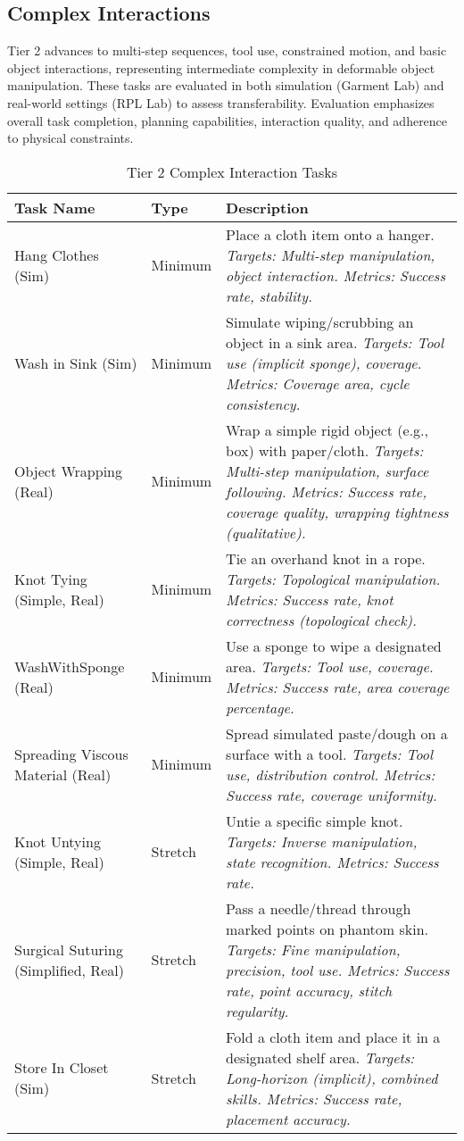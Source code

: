 \subsection{Complex Interactions}

Tier 2 advances to multi-step sequences, tool use, constrained motion, and basic object interactions, representing intermediate complexity in deformable object manipulation. These tasks are evaluated in both simulation (Garment Lab) and real-world settings (RPL Lab) to assess transferability. Evaluation emphasizes overall task completion, planning capabilities, interaction quality, and adherence to physical constraints.

\begin{table}[h]
\centering
\begin{tabular}{|p{3.5cm}|p{2cm}|p{8.5cm}|}
\hline
\textbf{Task Name} & \textbf{Type} & \textbf{Description} \\
\hline
Hang Clothes (Sim) & Minimum & Place a cloth item onto a hanger. \textit{Targets: Multi-step manipulation, object interaction. Metrics: Success rate, stability.} \\
\hline
Wash in Sink (Sim) & Minimum & Simulate wiping/scrubbing an object in a sink area. \textit{Targets: Tool use (implicit sponge), coverage. Metrics: Coverage area, cycle consistency.} \\
\hline
Object Wrapping (Real) & Minimum & Wrap a simple rigid object (e.g., box) with paper/cloth. \textit{Targets: Multi-step manipulation, surface following. Metrics: Success rate, coverage quality, wrapping tightness (qualitative).} \\
\hline
Knot Tying (Simple, Real) & Minimum & Tie an overhand knot in a rope. \textit{Targets: Topological manipulation. Metrics: Success rate, knot correctness (topological check).} \\
\hline
WashWithSponge (Real) & Minimum & Use a sponge to wipe a designated area. \textit{Targets: Tool use, coverage. Metrics: Success rate, area coverage percentage.} \\
\hline
Spreading Viscous Material (Real) & Minimum & Spread simulated paste/dough on a surface with a tool. \textit{Targets: Tool use, distribution control. Metrics: Success rate, coverage uniformity.} \\
\hline
Knot Untying (Simple, Real) & Stretch & Untie a specific simple knot. \textit{Targets: Inverse manipulation, state recognition. Metrics: Success rate.} \\
\hline
Surgical Suturing (Simplified, Real) & Stretch & Pass a needle/thread through marked points on phantom skin. \textit{Targets: Fine manipulation, precision, tool use. Metrics: Success rate, point accuracy, stitch regularity.} \\
\hline
Store In Closet (Sim) & Stretch & Fold a cloth item and place it in a designated shelf area. \textit{Targets: Long-horizon (implicit), combined skills. Metrics: Success rate, placement accuracy.} \\
\hline
\end{tabular}
\caption{Tier 2 Complex Interaction Tasks}
\end{table}

